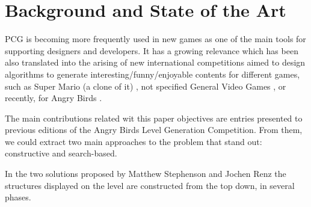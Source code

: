 \documentclass[runningheads,a4paper]{llncs}
\begin{document}
 



\section{Background and State of the Art}
\label{sec:soa}


PCG is becoming more frequently used in new games as one of the main tools for supporting designers and developers. It has a growing relevance which has been also translated into the arising of new international competitions aimed to design algorithms to generate interesting/funny/enjoyable contents for different games, such as Super Mario (a clone of it) \cite{MarioAI_Level_12}, not specified General Video Games \cite{GAIG_LevelGeneration_18,Khalifa_GVGLG_16}, or recently, for Angry Birds \cite{AngryBirds_LevelGeneration_18}.




The main contributions related wit this paper objectives are entries presented to previous editions of the Angry Birds Level Generation Competition. 
From them, we could extract two main approaches to the problem that stand out: constructive and search-based.


In the two solutions proposed by Matthew Stephenson and Jochen Renz \cite{stephenson2017generating} \cite{stephenson2016procedural} the structures displayed on the level are constructed from the top down, in several phases. 
\end{document}
